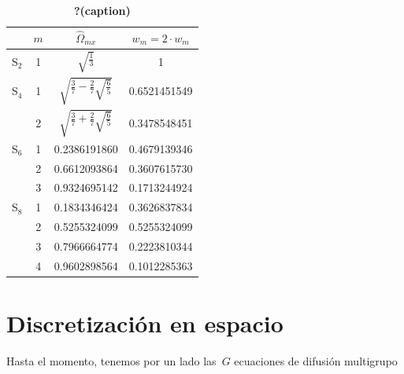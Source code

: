 \documentclass[
  12pt,
  a4paper,
  table]{scrbook}
\theoremstyle{plain}
\theoremstyle{definition}
\theoremstyle{plain}
\theoremstyle{plain}
\theoremstyle{remark}
\begin{document}
\begin{table}

\begin{minipage}[t]{\linewidth}

{\centering 

\begin{tabular}[t]{lccc}
\toprule
 & \(m\) & \(\hat{\Omega}_{mx}\) & \(w_m = 2 \cdot w_m\)\\
\midrule
S\(_2\) & 1 & \(\sqrt{\frac{1}{3}}\) & 1\\
S\(_4\) & 1 & \(\sqrt{\frac{3}{7}-\frac{2}{7}\sqrt{\frac{6}{5}}}\) & 0.6521451549\\
 & 2 & \(\sqrt{\frac{3}{7}+\frac{2}{7}\sqrt{\frac{6}{5}}}\) & 0.3478548451\\
S\(_6\) & 1 & 0.2386191860 & 0.4679139346\\
 & 2 & 0.6612093864 & 0.3607615730\\
 & 3 & 0.9324695142 & 0.1713244924\\
S\(_8\) & 1 & 0.1834346424 & 0.3626837834\\
 & 2 & 0.5255324099 & 0.5255324099\\
 & 3 & 0.7966664774 & 0.2223810344\\
 & 4 & 0.9602898564 & 0.1012285363\\
\bottomrule
\end{tabular}

}

\end{minipage}%

\caption{\label{tbl-gauss1d}\textbf{?(caption)}}

\end{table}

\hypertarget{sec-discretizacion-espacial}{%
\section{Discretización en espacio}\label{sec-discretizacion-espacial}}

Hasta el momento, tenemos por un lado las~\(G\) ecuaciones de difusión
multigrupo
\end{document}
